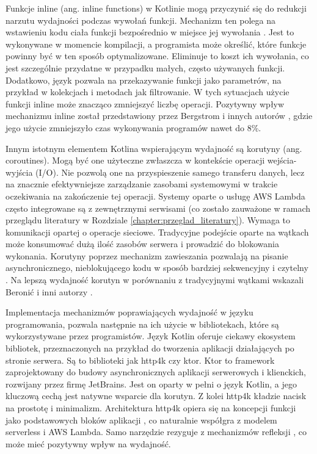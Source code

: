 Funkcje inline (ang. inline functions) w Kotlinie mogą przyczynić się do redukcji narzutu wydajności podczas wywołań funkcji.
Mechanizm ten polega na wstawieniu kodu ciała funkcji bezpośrednio w miejsce jej wywołania \cite{kotlinlangKotlinDocs}.
Jest to wykonywane w momencie kompilacji, a programista może określić, które funkcje powinny być w ten sposób optymalizowane.
Eliminuje to koszt ich wywołania, co jest szczególnie przydatne w przypadku małych, często używanych funkcji.
Dodatkowo, język pozwala na przekazywanie funkcji jako parametrów, na przykład w kolekcjach i metodach jak filtrowanie.
W tych sytuacjach użycie funkcji inline może znacząco zmniejszyć liczbę operacji.
Pozytywny wpływ mechanizmu inline został przedstawiony przez Bergstrom i innych autorów \cite{DBLP:journals/corr/BergstromFRS13}, gdzie jego użycie zmniejszyło czas wykonywania programów nawet do 8\%.

Innym istotnym elementem Kotlina wspierającym wydajność są korutyny (ang. coroutines).
Mogą być one użyteczne zwłaszcza w kontekście operacji wejścia-wyjścia (I/O).
Nie pozwolą one na przyspieszenie samego transferu danych, lecz na znacznie efektywniejsze zarządzanie zasobami systemowymi w trakcie oczekiwania na zakończenie tej operacji.
Systemy oparte o usługę AWS Lambda często integrowane są z zewnętrznymi serwisami (co zostało zauważone w ramach przeglądu literatury w Rozdziale \ref{chapter:przeglad_literatury}).
Wymaga to komunikacji opartej o operacje sieciowe.
Tradycyjne podejście oparte na wątkach może konsumować dużą ilość zasobów serwera i prowadzić do blokowania wykonania.
Korutyny poprzez mechanizm zawieszania pozwalają na pisanie asynchronicznego, nieblokującego kodu w sposób bardziej sekwencyjny i czytelny \cite{kotlinlangKotlinDocs}.
Na lepszą wydajność korutyn w porównaniu z tradycyjnymi wątkami wskazali Beronić i inni autorzy \cite{9803765}.

Implementacja mechanizmów poprawiających wydajność w języku programowania, pozwala następnie na ich użycie w bibliotekach, które są wykorzystywane przez programistów.
Język Kotlin oferuje ciekawy ekosystem bibliotek, przeznaczonych na przykład do tworzenia aplikacji działających po stronie serwera.
Są to biblioteki jak http4k czy ktor.
Ktor to framework zaprojektowany do budowy asynchronicznych aplikacji serwerowych i klienckich, rozwijany przez firmę JetBrains.
Jest on oparty w pełni o język Kotlin, a jego kluczową cechą jest natywne wsparcie dla korutyn.
Z kolei http4k kładzie nacisk na prostotę i minimalizm.
Architektura http4k opiera się na koncepcji funkcji jako podstawowych bloków aplikacji \cite{http4kCoreDocs}, co naturalnie współgra z modelem serverless i AWS Lambda.
Samo narzędzie rezyguje z mechanizmów refleksji \cite{http4kCoreDocs}, co może mieć pozytywny wpływ na wydajność.

